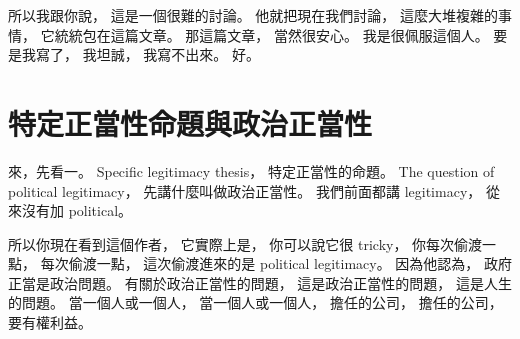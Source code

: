 \hypertarget{w02:cue:906}{}所以我跟你說，
\hypertarget{w02:cue:907}{}這是一個很難的討論。
\hypertarget{w02:cue:908}{}他就把現在我們討論，
\hypertarget{w02:cue:909}{}這麼大堆複雜的事情，
\hypertarget{w02:cue:910}{}它統統包在這篇文章。
\hypertarget{w02:cue:911}{}那這篇文章，
\hypertarget{w02:cue:912}{}當然很安心。
\hypertarget{w02:cue:913}{}我是很佩服這個人。
\hypertarget{w02:cue:914}{}要是我寫了，
\hypertarget{w02:cue:915}{}我坦誠，
\hypertarget{w02:cue:916}{}我寫不出來。
\hypertarget{w02:cue:917}{}好。

\section{特定正當性命題與政治正當性}

\hypertarget{w02:cue:918}{}來，先看一。
\hypertarget{w02:cue:919}{}Specific legitimacy thesis，
\hypertarget{w02:cue:920}{}特定正當性的命題。
\hypertarget{w02:cue:921}{}The question of political legitimacy，
\hypertarget{w02:cue:922}{}先講什麼叫做政治正當性。
\hypertarget{w02:cue:923}{}我們前面都講 legitimacy，
\hypertarget{w02:cue:924}{}從來沒有加 political。

\hypertarget{w02:cue:925}{}所以你現在看到這個作者，
\hypertarget{w02:cue:926}{}它實際上是，
\hypertarget{w02:cue:927}{}你可以說它很 tricky，
\hypertarget{w02:cue:928}{}你每次偷渡一點，
\hypertarget{w02:cue:929}{}每次偷渡一點，
\hypertarget{w02:cue:930}{}這次偷渡進來的是 political legitimacy。
\hypertarget{w02:cue:931}{}因為他認為，
\hypertarget{w02:cue:932}{}政府正當是政治問題。
\hypertarget{w02:cue:933}{}有關於政治正當性的問題，
\hypertarget{w02:cue:934}{}這是政治正當性的問題，
\hypertarget{w02:cue:935}{}這是人生的問題。
\hypertarget{w02:cue:936}{}當一個人或一個人，
\hypertarget{w02:cue:937}{}當一個人或一個人，
\hypertarget{w02:cue:938}{}擔任的公司，
\hypertarget{w02:cue:939}{}擔任的公司，
\hypertarget{w02:cue:940}{}要有權利益。

